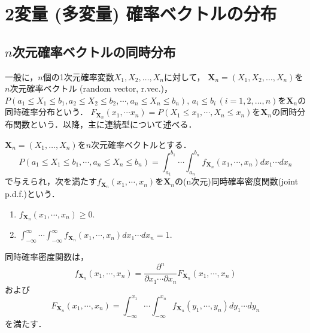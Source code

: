 \documentclass{jsreport}
\begin{document}
\chapter{2変量 (多変量) 確率ベクトルの分布}
\section{$n$次元確率ベクトルの同時分布}
一般に，$n$個の1次元確率変数$X_1, X_2, \ldots, X_n$に対して，
$\bm{X}_n = (X_1, X_2, \ldots, X_n)$を$n$次元確率ベクトル (random vector, r.vec.)，
$P(a_1 \leq X_1 \leq b_1, a_2 \leq X_2 \leq b_2, \cdots, a_n \leq X_n \leq b_n), \, a_i \leq b_i \, (i = 1, 2, \ldots, n)$を$\bm{X}_n$の同時確率分布という．
$F_{\bm{X}_n}(x_1, \cdots x_n) = P(X_1 \leq x_1, \cdots, X_n \leq x_n)$を$\bm{X}_n$の同時分布関数という．以降，主に連続型について述べる．

\begin{screen}
  \begin{defi}[同時確率密度関数]
    $\bm{X}_n = (X_1, \ldots, X_n)$を$n$次元確率ベクトルとする．
    \begin{equation}
      P(a_1 \leq X_1 \leq b_1, \cdots, a_n \leq X_n \leq b_n) = \int_{a_1}^{b_1} \cdots \int_{a_n}^{b_n} f_{\bm{X}_n}(x_1, \cdots, x_n) dx_1 \cdots dx_n \nonumber
    \end{equation}
    で与えられ，次を満たす$f_{\bm{X}_n}(x_1, \cdots, x_n)$を$\bm{X}_n$の(n次元)同時確率密度関数(joint p.d.f.)という．
    \begin{enumerate}
      \item $f_{\bm{X}_n}(x_1, \cdots, x_n) \geq 0$.
      \item $\int_{-\infty}^{\infty} \cdots \int_{-\infty}^{\infty} f_{\bm{X}_n}(x_1, \cdots, x_n) dx_1 \cdots dx_n = 1$.
    \end{enumerate}
  \end{defi}
\end{screen}

同時確率密度関数は，
\begin{equation}
  f_{\bm{X}_n}(x_1, \cdots, x_n) = \frac{\partial^n}{\partial x_1 \cdots \partial x_n} F_{\bm{X}_n}(x_1, \cdots, x_n) \nonumber
\end{equation}
および
\begin{equation}
  F_{\bm{X}_n}(x_1, \cdots, x_n) = \int_{-\infty}^{x_1} \cdots \int_{-\infty}^{x_n} f_{\bm{X}_n}(y_1, \cdots, y_n) dy_1 \cdots dy_n \nonumber
\end{equation}
を満たす．
\end{document}

